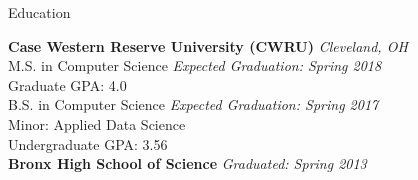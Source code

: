 \documentclass{resume} %
\begin{document}

\begin{rSection}{Education}

{\bf Case Western Reserve University (CWRU)} \hfill {\em Cleveland, OH} \\
M.S. in Computer Science \hfill {\em Expected Graduation: Spring 2018}\\ 
\setlength\parindent{24pt} \indent Graduate GPA: 4.0 \\
B.S. in Computer Science \hfill {\em Expected Graduation: Spring 2017}\\
\setlength\parindent{24pt} \indent Minor: Applied Data Science \\
\setlength\parindent{24pt} \indent Undergraduate GPA: 3.56 \\
{\bf Bronx High School of Science} \hfill {\em Graduated: Spring 2013}

\end{rSection}

\end{document}
